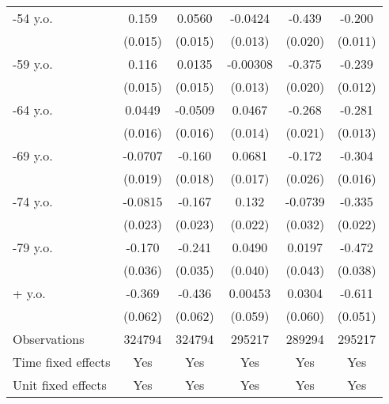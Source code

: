 \begin{table}[htbp]
\begin{tabular}{l*{5}{c}}
\addlinespace
50-54 y.o.      &    0.159\sym{***}&   0.0560\sym{***}&  -0.0424\sym{***}&   -0.439\sym{***}&   -0.200\sym{***}\\
                &  (0.015)         &  (0.015)         &  (0.013)         &  (0.020)         &  (0.011)         \\
\addlinespace
55-59 y.o.      &    0.116\sym{***}&   0.0135         & -0.00308         &   -0.375\sym{***}&   -0.239\sym{***}\\
                &  (0.015)         &  (0.015)         &  (0.013)         &  (0.020)         &  (0.012)         \\
\addlinespace
60-64 y.o.      &   0.0449\sym{**} &  -0.0509\sym{**} &   0.0467\sym{***}&   -0.268\sym{***}&   -0.281\sym{***}\\
                &  (0.016)         &  (0.016)         &  (0.014)         &  (0.021)         &  (0.013)         \\
\addlinespace
65-69 y.o.      &  -0.0707\sym{***}&   -0.160\sym{***}&   0.0681\sym{***}&   -0.172\sym{***}&   -0.304\sym{***}\\
                &  (0.019)         &  (0.018)         &  (0.017)         &  (0.026)         &  (0.016)         \\
\addlinespace
70-74 y.o.      &  -0.0815\sym{***}&   -0.167\sym{***}&    0.132\sym{***}&  -0.0739\sym{*}  &   -0.335\sym{***}\\
                &  (0.023)         &  (0.023)         &  (0.022)         &  (0.032)         &  (0.022)         \\
\addlinespace
75-79 y.o.      &   -0.170\sym{***}&   -0.241\sym{***}&   0.0490         &   0.0197         &   -0.472\sym{***}\\
                &  (0.036)         &  (0.035)         &  (0.040)         &  (0.043)         &  (0.038)         \\
\addlinespace
80+ y.o.        &   -0.369\sym{***}&   -0.436\sym{***}&  0.00453         &   0.0304         &   -0.611\sym{***}\\
                &  (0.062)         &  (0.062)         &  (0.059)         &  (0.060)         &  (0.051)         \\
\midrule
Observations    &   324794         &   324794         &   295217         &   289294         &   295217         \\
Time fixed effects&      Yes         &      Yes         &      Yes         &      Yes         &      Yes         \\
Unit fixed effects&      Yes         &      Yes         &      Yes         &      Yes         &      Yes         \\

\end{tabular}
\end{table}
